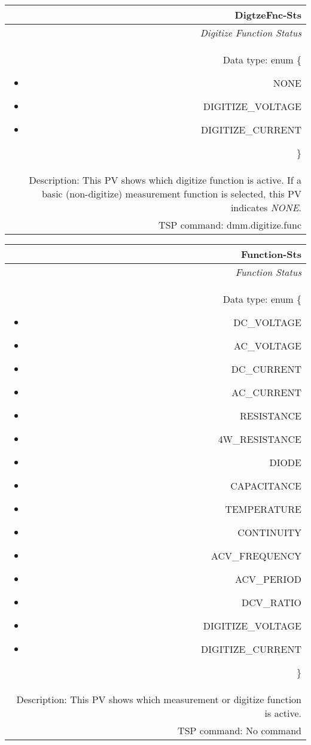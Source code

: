 \documentclass[openany]{article}
\begin{document}
		\begin{tabular}{N}
			\hline
			\bfseries DigtzeFnc-Sts\label{pv:digtzefnc-sts} \\ \hline
			\emph{Digitize Function Status} \\
			Data type: enum \{\begin{itemize}[noitemsep]
				\small
				\item[] NONE
				\item[] DIGITIZE\_VOLTAGE
				\item[] DIGITIZE\_CURRENT
			\end{itemize}\} \\
			Description: This PV shows which digitize function is active. If a basic (non-digitize) measurement function is selected, this PV indicates \emph{NONE}. \\
			TSP command: dmm.digitize.func
		\end{tabular}

		\begin{tabular}{N}
			\hline
			\bfseries Function-Sts\label{pv:function-sts} \\ \hline
			\emph{Function Status} \\
			Data type: enum \{\begin{itemize}[noitemsep]
				\item[] DC\_VOLTAGE
				\item[] AC\_VOLTAGE
				\item[] DC\_CURRENT
				\item[] AC\_CURRENT
				\item[] RESISTANCE
				\item[] 4W\_RESISTANCE
				\item[] DIODE
				\item[] CAPACITANCE
				\item[] TEMPERATURE
				\item[] CONTINUITY
				\item[] ACV\_FREQUENCY
				\item[] ACV\_PERIOD
				\item[] DCV\_RATIO
				\item[] DIGITIZE\_VOLTAGE
				\item[] DIGITIZE\_CURRENT
			\end{itemize}\} \\
			Description: This PV shows which measurement or digitize function is active. \\
			TSP command: No command
		\end{tabular}
\end{document}
